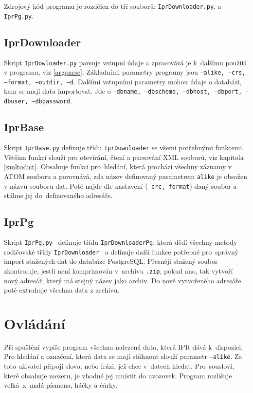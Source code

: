 Zdrojový kód programu je rozdělen do tří souborů: 
{\tt IprDownloader.py},  a {\tt IprPg.py}.


\subsection{IprDownloader}
Skript {\tt IprDowloader.py} parsuje vstupní údaje a
zpracovává je k~dalšímu použití v programu, viz \ref{argparse}. Základními parametry programy jsou
{\tt ---alike, ---crs, ---format, ---outdir, ---d}.
Dalšími vstupními parametry mohou údaje o databázi, kam se mají data
importovat. Jde o 
{\tt ---dbname, ---dbschema, ---dbhost, ---dbport, ---dbuser, ---dbpassword}.



\subsection{IprBase}
Skript {\tt IprBase.py} definuje třídu {\tt IprDownloader} se všemi
potřebnými funkcemi. Většina funkcí slouží pro otevírání, čtení a
parsování XML souborů, viz kapitola \ref{xmltodict}. Obsahuje funkci
pro~hledání, která prochází všechny záznamy v ATOM souboru a porovnává, zda název
definovaný parametrem {\tt alike} je obsažen v názvu souboru dat. Poté najde dle nastavení ({\tt
  crc, format}) daný soubor a stáhne jej do~definovaného adresáře.


\subsection{IprPg}
Skript {\tt IprPg.py } definuje třídu {\tt IprDownloaderPg}, která
dědí všechny metody rodičovské třídy {\tt IprDownloader } a definuje další
funkce potřebné pro~správný import stažených dat do databáze
PostgreSQL. Přesněji stažený soubor zkontroluje, jestli není 
komprimován v~archivu {\tt *.zip}, pokud ano, tak vytvoří nový adresář,
který má stejný název jako archiv. Do nově vytvořeného adresáře poté 
extrahuje všechna data z archivu.


\section{Ovládání}
Při spuštění vypíše program všechna nalezená data,
která IPR dává k~dispozici. Pro hledání a označení, která data se mají
stáhnout slouží parametr {\tt ---alike}. Za toto uživatel připojí slovo, nebo
frázi, jež chce v~datech hledat. Pro~sousloví, které obsahuje mezeru,
je vhodné jej umístit do uvozovek. Program rozlišuje velká~x~malá
písmena, háčky a čárky.

